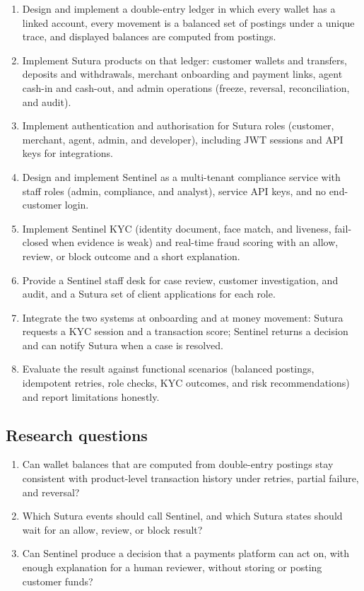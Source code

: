 \documentclass[12pt,a4paper]{article}
\begin{document}
\begin{enumerate}
  \item Design and implement a double-entry ledger in which every wallet has a linked account, every movement is a balanced set of postings under a unique trace, and displayed balances are computed from postings.
  \item Implement Sutura products on that ledger: customer wallets and transfers, deposits and withdrawals, merchant onboarding and payment links, agent cash-in and cash-out, and admin operations (freeze, reversal, reconciliation, and audit).
  \item Implement authentication and authorisation for Sutura roles (customer, merchant, agent, admin, and developer), including JWT sessions and API keys for integrations.
  \item Design and implement Sentinel as a multi-tenant compliance service with staff roles (admin, compliance, and analyst), service API keys, and no end-customer login.
  \item Implement Sentinel KYC (identity document, face match, and liveness, fail-closed when evidence is weak) and real-time fraud scoring with an allow, review, or block outcome and a short explanation.
  \item Provide a Sentinel staff desk for case review, customer investigation, and audit, and a Sutura set of client applications for each role.
  \item Integrate the two systems at onboarding and at money movement: Sutura requests a KYC session and a transaction score; Sentinel returns a decision and can notify Sutura when a case is resolved.
  \item Evaluate the result against functional scenarios (balanced postings, idempotent retries, role checks, KYC outcomes, and risk recommendations) and report limitations honestly.
\end{enumerate}

\subsection{Research questions}

\begin{enumerate}
  \item Can wallet balances that are computed from double-entry postings stay consistent with product-level transaction history under retries, partial failure, and reversal?
  \item Which Sutura events should call Sentinel, and which Sutura states should wait for an allow, review, or block result?
  \item Can Sentinel produce a decision that a payments platform can act on, with enough explanation for a human reviewer, without storing or posting customer funds?
\end{enumerate}
\end{document}
